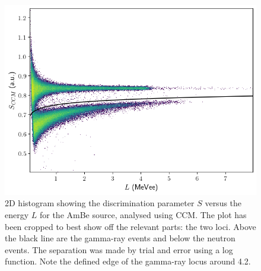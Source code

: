 \documentclass[11pt]{article}
\numberwithin{equation}{section}
\numberwithin{figure}{section}
\numberwithin{table}{section}
\begin{document}
\begin{figure}[H]
    \begin{center}
        \includegraphics[scale=0.75]{Plots/CCM_AmBe_hist2d.png}
        \caption{2D histogram showing the discrimination parameter $S$ versus the energy $L$ for the AmBe source, analysed using CCM. The plot has been cropped to best show off the relevant parts: the two loci. Above the black line are the gamma-ray events and below the neutron events. The separation was made by trial and error using a log function. Note the defined edge of the gamma-ray locus around \SI{4.2}{\mevee}.}
        \label{fig:CCM_AmBe_hist2d}
    \end{center}
\end{figure}
\end{document}
